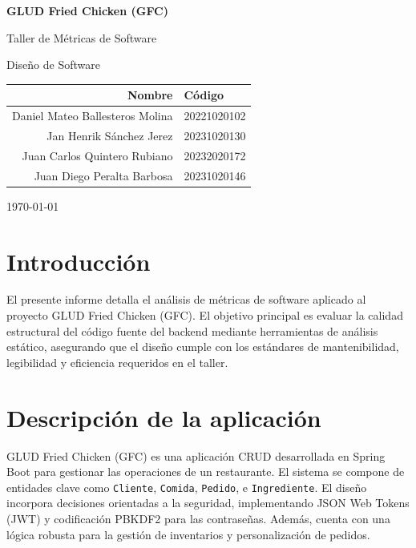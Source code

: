 \documentclass[12pt, a4paper]{article}
\begin{document}
\begin{titlepage}
  \centering
  \vspace*{2cm}

  {\Huge\bfseries GLUD Fried Chicken (GFC)\par}
  \vspace{1cm}
  {\Large Taller de Métricas de Software\par}
  \vspace{0.5cm}
  {\large Diseño de Software\par}

  \vspace{2cm}
  \begin{tabular}{rl}
    \textbf{Nombre} & \textbf{Código} \\
    \hline
    Daniel Mateo Ballesteros Molina & 20221020102 \\
    Jan Henrik Sánchez Jerez & 20231020130 \\
    Juan Carlos Quintero Rubiano & 20232020172 \\
    Juan Diego Peralta Barbosa & 20231020146 \\
  \end{tabular}

  \vspace{3cm}
  {\large \today\par}
\end{titlepage}

\tableofcontents
\newpage

\section{Introducción}
El presente informe detalla el análisis de métricas de software aplicado al proyecto GLUD Fried Chicken (GFC). El objetivo principal es evaluar la calidad estructural del código fuente del backend mediante herramientas de análisis estático, asegurando que el diseño cumple con los estándares de mantenibilidad, legibilidad y eficiencia requeridos en el taller.

\section{Descripción de la aplicación}
GLUD Fried Chicken (GFC) es una aplicación CRUD desarrollada en Spring Boot para gestionar las operaciones de un restaurante. El sistema se compone de entidades clave como \texttt{Cliente}, \texttt{Comida}, \texttt{Pedido}, e \texttt{Ingrediente}. El diseño incorpora decisiones orientadas a la seguridad, implementando JSON Web Tokens (JWT) y codificación PBKDF2 para las contraseñas. Además, cuenta con una lógica robusta para la gestión de inventarios y personalización de pedidos.
\end{document}
